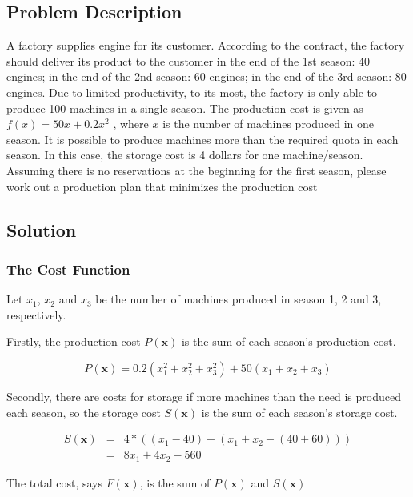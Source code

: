 \documentclass[12pt]{article}
\begin{document}
\subsection{Problem Description}

A factory supplies engine for its customer. According to the contract, the
factory should deliver its product to the customer in the end of the 1st season: 40 engines;
in the end of the 2nd season: 60 engines; in the end of the 3rd season: 80 engines. Due
to limited productivity, to its most, the factory is only able to produce 100 machines
in a single season. The production cost is given as $f(x) = 50x + 0.2x^2$
, where $x$ is the
number of machines produced in one season. It is possible to produce machines more
than the required quota in each season. In this case, the storage cost is 4 dollars for one
machine/season. Assuming there is no reservations at the beginning for the first season,
please work out a production plan that minimizes the production cost

\subsection{Solution}

\subsubsection{The Cost Function}

Let $x_1$, $x_2$ and $x_3$ be the number of machines produced in season 1, 2 and 3, respectively.

Firstly, the production cost $P(\mathbf{x})$ is the sum of each season's production cost.

\begin{equation}
	P(\mathbf{x})=0.2(x_1^2+x_2^2+x_3^2)+50(x_1+x_2+x_3)
\end{equation}

Secondly, there are costs for storage if more machines than the need is produced each season, so the storage cost  $S(\mathbf{x})$ is the sum of each season's storage cost.

\begin{equation}
	\begin{aligned}
		S(\mathbf{x}) &=& 4*((x_1-40)+(x_1+x_2-(40+60))) \\
		&=& 8x_1+4x_2-560
	\end{aligned}
\end{equation}

The total cost, says $F(\mathbf{x})$, is the sum of $P(\mathbf{x})$ and $S(\mathbf{x})$ 
\end{document}
